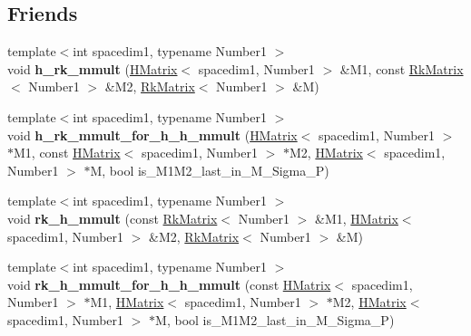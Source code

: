 \subsection*{Friends}
\begin{DoxyCompactItemize}
\item 
\mbox{\label{classRkMatrix_a1b5b4592067610eec18b830482897243}} 
{\footnotesize template$<$int spacedim1, typename Number1 $>$ }\\void {\bfseries h\+\_\+rk\+\_\+mmult} (\hyperlink{classHMatrix}{H\+Matrix}$<$ spacedim1, Number1 $>$ \&M1, const \hyperlink{classRkMatrix}{Rk\+Matrix}$<$ Number1 $>$ \&M2, \hyperlink{classRkMatrix}{Rk\+Matrix}$<$ Number1 $>$ \&M)
\item 
\mbox{\label{classRkMatrix_a614ba3b92b97d95cb3146db181611a34}} 
{\footnotesize template$<$int spacedim1, typename Number1 $>$ }\\void {\bfseries h\+\_\+rk\+\_\+mmult\+\_\+for\+\_\+h\+\_\+h\+\_\+mmult} (\hyperlink{classHMatrix}{H\+Matrix}$<$ spacedim1, Number1 $>$ $\ast$M1, const \hyperlink{classHMatrix}{H\+Matrix}$<$ spacedim1, Number1 $>$ $\ast$M2, \hyperlink{classHMatrix}{H\+Matrix}$<$ spacedim1, Number1 $>$ $\ast$M, bool is\+\_\+\+M1\+M2\+\_\+last\+\_\+in\+\_\+\+M\+\_\+\+Sigma\+\_\+P)
\item 
\mbox{\label{classRkMatrix_afa94f9688a9443024a2631d2bfae06c8}} 
{\footnotesize template$<$int spacedim1, typename Number1 $>$ }\\void {\bfseries rk\+\_\+h\+\_\+mmult} (const \hyperlink{classRkMatrix}{Rk\+Matrix}$<$ Number1 $>$ \&M1, \hyperlink{classHMatrix}{H\+Matrix}$<$ spacedim1, Number1 $>$ \&M2, \hyperlink{classRkMatrix}{Rk\+Matrix}$<$ Number1 $>$ \&M)
\item 
\mbox{\label{classRkMatrix_a9b12cf1aa7504c436b84394f2116f6a9}} 
{\footnotesize template$<$int spacedim1, typename Number1 $>$ }\\void {\bfseries rk\+\_\+h\+\_\+mmult\+\_\+for\+\_\+h\+\_\+h\+\_\+mmult} (const \hyperlink{classHMatrix}{H\+Matrix}$<$ spacedim1, Number1 $>$ $\ast$M1, \hyperlink{classHMatrix}{H\+Matrix}$<$ spacedim1, Number1 $>$ $\ast$M2, \hyperlink{classHMatrix}{H\+Matrix}$<$ spacedim1, Number1 $>$ $\ast$M, bool is\+\_\+\+M1\+M2\+\_\+last\+\_\+in\+\_\+\+M\+\_\+\+Sigma\+\_\+P)
\item 
\mbox{\label{classRkMatrix_a85ccef980f81f9fb3c63675f3f9c014f}} 

\end{DoxyCompactItemize}
